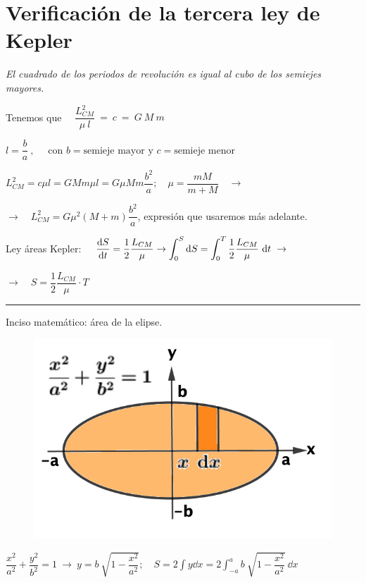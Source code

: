 \vspace{10mm} %
\section[Verificación de la tercera ley de Kepler]{Verificación de la tercera ley de Kepler}

\emph{El cuadrado de los periodos de revolución es igual al cubo de los semiejes mayores.}


Tenemos que $\quad \dfrac {L^2_{CM}}{\mu\ l}\ = \ c\ = \ G\ M\ m$

$l=\dfrac b a\ , \quad \text{ con } b=\text{semieje mayor y }c=\text{semieje menor}$

$L^2_{CM}=c\mu l=GMm\mu l=G\mu M m \dfrac {b^2}{a}; \quad \mu=\dfrac{mM}{m+M} \quad \to $

$\to \quad  L^2_{CM}=G\mu^2 (M+m) \dfrac {b^2}{a}$, expresión que usaremos más adelante.

Ley áreas Kepler: $\displaystyle \quad \dv{S}{t}=\dfrac 1 2 \dfrac {L_{CM}}{\mu} \to \int_0^S \dd S = \int_0^T \dfrac 1 2 \dfrac {L_{CM}}{\mu} \ \dd t \ \to $

$\displaystyle \to \quad S= \dfrac 1 2 \dfrac{L_{CM}}{\mu}\cdot T$

\vspace{35mm} %
\textcolor{gris}{\rule{50mm}{0.4pt} \hspace{5mm} Inciso matemático: área de la elipse.}
\begin{multicols}{2}
\begin{figure}[H]
	\centering
	\includegraphics[width=.5\textwidth]{imagenes/imagenes14/T14IM06.png}
\end{figure}
$\dfrac {x^2}{a^2}+\dfrac{y^2}{b^2}=1 \ \to \ y=b\ \sqrt{1-\dfrac{x^2}{a^2}};\quad S=2 \int y \dd x = \displaystyle 2\int_{-a}^{a} b\  \sqrt{1-\dfrac{x^2}{a^2}} \ \dd x$
\end{multicols}

